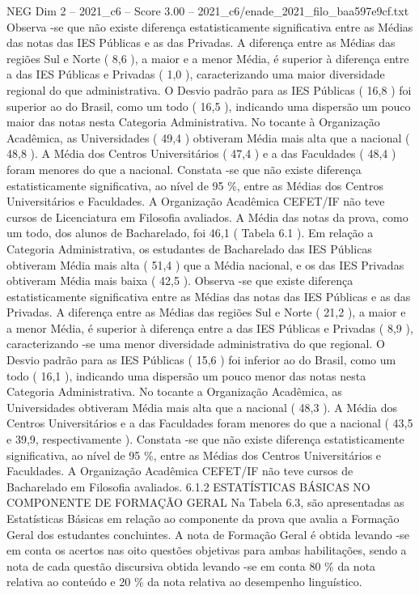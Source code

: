 \begin{textsample}{NEG Dim 2 – 2021\_c6 – Score 3.00 – 2021\_c6/enade\_2021\_filo\_baa597e9cf.txt}
Observa -se que não existe diferença estatisticamente significativa entre as Médias das notas das IES Públicas e as das Privadas.
A diferença entre as Médias das regiões Sul e Norte ( 8,6 ), a maior e a menor Média, é superior à diferença entre a das IES Públicas e Privadas ( 1,0 ), caracterizando uma maior diversidade regional do que administrativa.
O Desvio padrão para as IES Públicas ( 16,8 ) foi superior ao do Brasil, como um todo ( 16,5 ), indicando uma dispersão um pouco maior das notas nesta Categoria Administrativa.
No tocante à Organização Acadêmica, as Universidades ( 49,4 ) obtiveram Média mais alta que a nacional ( 48,8 ).
A Média dos Centros Universitários ( 47,4 ) e a das Faculdades ( 48,4 ) foram menores do que a nacional.
Constata -se que não existe diferença estatisticamente significativa, ao nível de 95 \%, entre as Médias dos Centros Universitários e Faculdades.
A Organização Acadêmica CEFET/IF não teve cursos de Licenciatura em Filosofia avaliados.
A Média das notas da prova, como um todo, dos alunos de Bacharelado, foi 46,1 ( Tabela 6.1 ).
Em relação a Categoria Administrativa, os estudantes de Bacharelado das IES Públicas obtiveram Média mais alta ( 51,4 ) que a Média nacional, e os das IES Privadas obtiveram Média mais baixa ( 42,5 ).
Observa -se que existe diferença estatisticamente significativa entre as Médias das notas das IES Públicas e as das Privadas.
A diferença entre as Médias das regiões Sul e Norte ( 21,2 ), a maior e a menor Média, é superior à diferença entre a das IES Públicas e Privadas ( 8,9 ), caracterizando -se uma menor diversidade administrativa do que regional.
O Desvio padrão para as IES Públicas ( 15,6 ) foi inferior ao do Brasil, como um todo ( 16,1 ), indicando uma dispersão um pouco menor das notas nesta Categoria Administrativa.
No tocante a Organização Acadêmica, as Universidades obtiveram Média mais alta que a nacional ( 48,3 ).
A Média dos Centros Universitários e a das Faculdades foram menores do que a nacional ( 43,5 e 39,9, respectivamente ).
Constata -se que não existe diferença estatisticamente significativa, ao nível de 95 \%, entre as Médias dos Centros Universitários e Faculdades.
A Organização Acadêmica CEFET/IF não teve cursos de Bacharelado em Filosofia avaliados. 6.1.2 ESTATÍSTICAS BÁSICAS NO COMPONENTE DE FORMAÇÃO GERAL Na Tabela 6.3, são apresentadas as Estatísticas Básicas em relação ao componente da prova que avalia a Formação Geral dos estudantes concluintes.
A nota de Formação Geral é obtida levando -se em conta os acertos nas oito questões objetivas para ambas habilitações, sendo a nota de cada questão discursiva obtida levando -se em conta 80 \% da nota relativa ao conteúdo e 20 \% da nota relativa ao desempenho linguístico.

\end{textsample}
